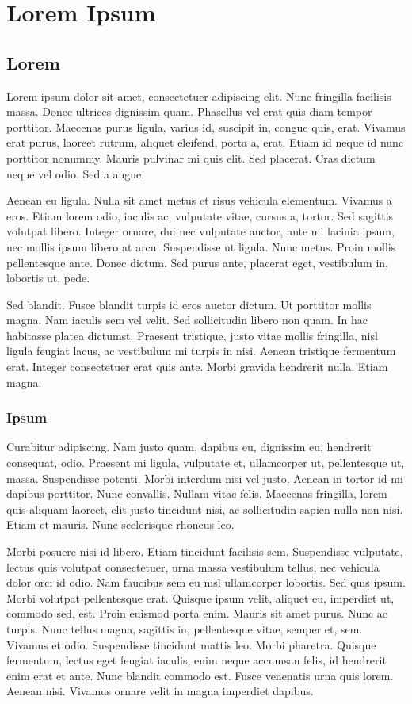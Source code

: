 
\chapter{Lorem Ipsum}

\section{Lorem}

Lorem ipsum dolor sit amet, consectetuer adipiscing elit. Nunc fringilla facilisis massa. Donec
ultrices dignissim quam. Phasellus vel erat quis diam tempor porttitor. Maecenas purus ligula,
varius id, suscipit in, congue quis, erat. Vivamus erat purus, laoreet rutrum, aliquet eleifend,
porta a, erat. Etiam id neque id nunc porttitor nonummy. Mauris pulvinar mi quis elit. Sed placerat.
Cras dictum neque vel odio. Sed a augue.

Aenean eu ligula. Nulla sit amet metus et risus vehicula elementum. Vivamus a eros. Etiam lorem
odio, iaculis ac, vulputate vitae, cursus a, tortor. Sed sagittis volutpat libero. Integer ornare,
dui nec vulputate auctor, ante mi lacinia ipsum, nec mollis ipsum libero at arcu. Suspendisse ut
ligula. Nunc metus. Proin mollis pellentesque ante. Donec dictum. Sed purus ante, placerat eget,
vestibulum in, lobortis ut, pede.

Sed blandit. Fusce blandit turpis id eros auctor dictum. Ut porttitor mollis magna. Nam iaculis sem
vel velit. Sed sollicitudin libero non quam. In hac habitasse platea dictumst. Praesent tristique,
justo vitae mollis fringilla, nisl ligula feugiat lacus, ac vestibulum mi turpis in nisi. Aenean
tristique fermentum erat. Integer consectetuer erat quis ante. Morbi gravida hendrerit nulla. Etiam
magna.

\subsection{Ipsum}

Curabitur adipiscing. Nam justo quam, dapibus eu, dignissim eu, hendrerit consequat, odio. Praesent
mi ligula, vulputate et, ullamcorper ut, pellentesque ut, massa. Suspendisse potenti. Morbi interdum
nisi vel justo. Aenean in tortor id mi dapibus porttitor. Nunc convallis. Nullam vitae felis.
Maecenas fringilla, lorem quis aliquam laoreet, elit justo tincidunt nisi, ac sollicitudin sapien
nulla non nisi. Etiam et mauris. Nunc scelerisque rhoncus leo.

Morbi posuere nisi id libero. Etiam tincidunt facilisis sem. Suspendisse vulputate, lectus quis
volutpat consectetuer, urna massa vestibulum tellus, nec vehicula dolor orci id odio. Nam faucibus
sem eu nisl ullamcorper lobortis. Sed quis ipsum. Morbi volutpat pellentesque erat. Quisque ipsum
velit, aliquet eu, imperdiet ut, commodo sed, est. Proin euismod porta enim. Mauris sit amet purus.
Nunc ac turpis. Nunc tellus magna, sagittis in, pellentesque vitae, semper et, sem. Vivamus et odio.
Suspendisse tincidunt mattis leo. Morbi pharetra. Quisque fermentum, lectus eget feugiat iaculis,
enim neque accumsan felis, id hendrerit enim erat et ante. Nunc blandit commodo est. Fusce venenatis
urna quis lorem. Aenean nisi. Vivamus ornare velit in magna imperdiet dapibus.

